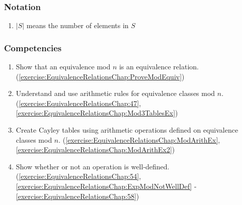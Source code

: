 \subsubsection*{Notation}
\begin{enumerate}
\item 
$|S|$ means the number of elements in $S$
\end{enumerate}

\subsubsection*{Competencies}
\begin{enumerate}
\item
Show that an equivalence mod $n$ is an equivalence relation. (\ref{exercise:EquivalenceRelationsChap:ProveModEquiv})
\item
Understand and use arithmetic rules for equivalence classes mod $n$. (\ref{exercise:EquivalenceRelationsChap:47}, \ref{exercise:EquivalenceRelationsChap:Mod3TablesEx})
\item
Create Cayley tables using arithmetic operations defined on equivalence classes mod $n$. (\ref{exercise:EquivalenceRelationsChap:ModArithEx}, \ref{exercise:EquivalenceRelationsChap:ModArithEx2})
\item
Show whether or not an operation is well-defined. (\ref{exercise:EquivalenceRelationsChap:54}, \ref{exercise:EquivalenceRelationsChap:ExpModNotWellDef} -  \ref{exercise:EquivalenceRelationsChap:58})
\end{enumerate}



